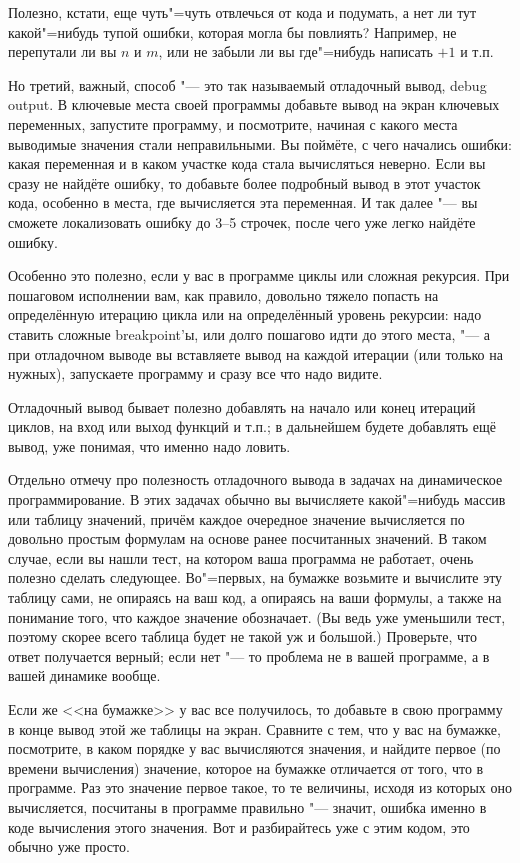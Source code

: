 Полезно, кстати, еще чуть"=чуть отвлечься от кода и подумать, а нет ли тут какой"=нибудь тупой ошибки, которая могла бы повлиять?
Например, не перепутали ли вы $n$ и $m$, или не забыли ли вы где"=нибудь написать $+1$ и т.п.

Но третий, важный, способ "--- это так называемый отладочный вывод, debug output. 
В ключевые места своей программы добавьте вывод на экран ключевых переменных, запустите программу, и посмотрите, 
начиная с какого места выводимые значения стали неправильными.
Вы поймёте, с чего начались ошибки: какая переменная и в каком участке кода стала вычисляться неверно. 
Если вы сразу не найдёте ошибку, то добавьте более подробный вывод в этот участок кода, особенно в места, где вычисляется эта переменная.
И так далее "--- вы сможете локализовать ошибку до 3--5 строчек, после чего уже легко найдёте ошибку.

Особенно это полезно, если у вас в программе циклы или сложная рекурсия. 
При пошаговом исполнении вам, как правило, довольно тяжело попасть на определённую итерацию цикла или на определённый уровень рекурсии:
надо ставить сложные breakpoint'ы, или долго пошагово идти до этого места, "--- а при отладочном выводе вы вставляете вывод на каждой итерации
(или только на нужных), запускаете программу и сразу все что надо видите.

Отладочный вывод бывает полезно добавлять на начало или конец итераций циклов, на вход или выход функций и т.п.; 
в дальнейшем будете добавлять ещё вывод, уже понимая, что именно надо ловить.

Отдельно отмечу про полезность отладочного вывода в задачах на динамическое программирование.
В этих задачах обычно вы вычисляете какой"=нибудь массив или таблицу значений, причём каждое очередное значение вычисляется по довольно простым формулам
на основе ранее посчитанных значений. 
В таком случае, если вы нашли тест, на котором ваша программа не работает, очень полезно сделать следующее.
Во"=первых, на бумажке возьмите и вычислите эту таблицу сами, не опираясь на ваш код, а опираясь на ваши формулы,
а также на понимание того, что каждое значение обозначает. 
(Вы ведь уже уменьшили тест, поэтому скорее всего таблица будет не такой уж и большой.)
Проверьте, что ответ получается верный; если нет "--- то проблема не в вашей программе, а в вашей динамике вообще.

Если же <<на бумажке>> у вас все получилось, то добавьте в свою программу в конце вывод этой же таблицы на экран.
Сравните с тем, что у вас на бумажке, посмотрите, в каком порядке у вас вычисляются значения, и найдите первое (по времени вычисления) значение,
которое на бумажке отличается от того, что в программе. 
Раз это значение первое такое, то те величины, исходя из которых оно вычисляется, посчитаны в программе правильно "--- значит, 
ошибка именно в коде вычисления этого значения. 
Вот и разбирайтесь уже с этим кодом, это обычно уже просто.

